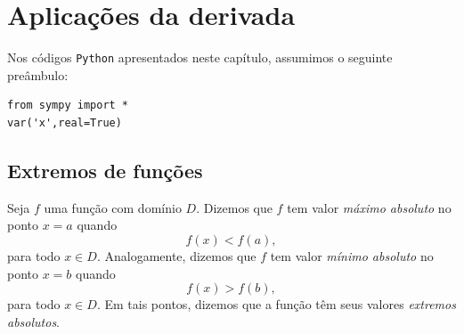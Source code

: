 
\chapter{Aplicações da derivada}\label{cap_apderiv}
\thispagestyle{fancy}

\ifispython
\begin{obs}
  Nos códigos \verb+Python+ apresentados neste capítulo, assumimos o seguinte preâmbulo:
\begin{verbatim}
from sympy import *
var('x',real=True)
\end{verbatim}
\end{obs}
\fi

\section{Extremos de funções}\label{cap_apderiv_sec_extfun}

Seja $f$ uma função com domínio $D$. Dizemos que $f$ tem valor \emph{máximo absoluto} no ponto $x=a$ quando
\begin{equation}
  f(x) < f(a),
\end{equation}
para todo $x\in D$. Analogamente, dizemos que $f$ tem valor \emph{mínimo absoluto} no ponto $x=b$ quando
\begin{equation}
  f(x) > f(b),
\end{equation}
para todo $x\in D$. Em tais pontos, dizemos que a função têm seus valores \emph{extremos absolutos}.

